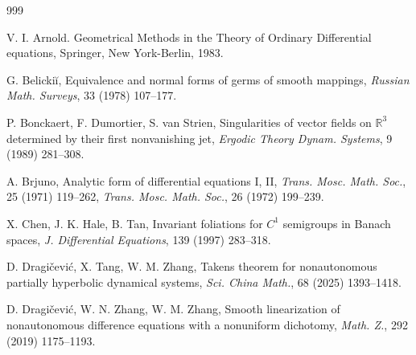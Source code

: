\documentclass[reqno]{amsart}
\numberwithin{equation}{section}
\begin{document}
\begin{thebibliography}{999}

V. I.  Arnold. Geometrical Methods in the Theory of Ordinary Differential equations,  Springer, New York-Berlin,
1983.



G. Belicki\u{i},
   Equivalence and normal forms of germs of smooth mappings,  {\em Russian Math. Surveys},  33 (1978)  107--177.

P. Bonckaert, F.  Dumortier, S. van Strien, Singularities of vector fields
on $\mathbb{R}^3$ determined by their first nonvanishing jet, {\em Ergodic Theory Dynam. Systems},  9 (1989)  281--308.


A. Brjuno, Analytic form of differential equations I, II, {\em Trans. Mosc. Math. Soc.}, 25 (1971) 119--262,
{\em Trans. Mosc. Math. Soc.},  26 (1972) 199--239.







X. Chen, J. K.  Hale,  B. Tan, Invariant foliations for $C^1$ semigroups in Banach spaces, {\em J.
Differential Equations},  139 (1997) 283--318.




D. Dragi\v{c}evi\'{c},  X. Tang, W. M. Zhang, Takens theorem for nonautonomous partially
hyperbolic dynamical systems,  {\em Sci. China Math.}, 68 (2025) 1393--1418.

D. Dragi\v{c}evi\'{c}, W. N. Zhang, W. M. Zhang, Smooth linearization of nonautonomous difference equations with a nonuniform dichotomy, {\em Math. Z.}, 292 (2019) 1175--1193.



\end{thebibliography}
\end{document}
